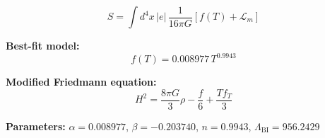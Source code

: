
\begin{equation}
  S = \int d^4x \, |e| \, \frac{1}{16\pi G} \left[ f(T) + \mathcal{L}_m \right]
\end{equation}

\textbf{Best-fit model:}
\begin{equation}
  f(T) = 0.008977 \, T^{0.9943}
\end{equation}

\textbf{Modified Friedmann equation:}
\begin{equation}
  H^2 = \frac{8\pi G}{3} \rho - \frac{f}{6} + \frac{T f_T}{3}
\end{equation}

\textbf{Parameters:}
$\alpha = 0.008977$, \quad
$\beta = -0.203740$, \quad
$n = 0.9943$, \quad
$\Lambda_{\text{BI}} = 956.2429$
